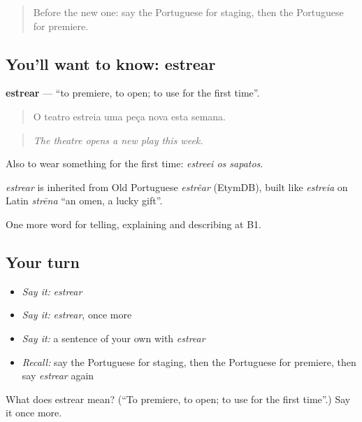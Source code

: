 \label{lesson:PT-C520-estrear}



\begin{quote}
Before the new one: say the Portuguese for staging, then the Portuguese for premiere.
\end{quote}

\subsection*{You'll want to know: estrear}
\textbf{estrear} — \textquotedblleft{}to premiere, to open; to use for the first time\textquotedblright{}.

\begin{quote}
O teatro estreia uma peça nova esta semana.
\end{quote}

\begin{quote}
\emph{The theatre opens a new play this week.}
\end{quote}

Also to wear something for the first time: \emph{estreei os sapatos}.

\begin{cousinweb}
\emph{estrear} is inherited from Old Portuguese \emph{estrẽar} (EtymDB), built like \emph{estreia} on Latin \emph{strēna} \textquotedblleft{}an omen, a lucky gift\textquotedblright{}.
\end{cousinweb}

\begin{grammarlens}[title={What you've built}]
One more word for telling, explaining and describing at B1.
\end{grammarlens}

\subsection*{Your turn}
\begin{itemize}
\raggedright
  \item \emph{Say it:} \emph{estrear}
  \item \emph{Say it:} \emph{estrear}, once more
  \item \emph{Say it:} a sentence of your own with \emph{estrear}
  \item \emph{Recall:} say the Portuguese for staging, then the Portuguese for premiere, then say \emph{estrear} again
\end{itemize}

\begin{tcolorbox}[breakable,colback=teal!4,colframe=teal!35!black,title={Before you move on}]
What does estrear mean? (\textquotedblleft{}To premiere, to open; to use for the first time\textquotedblright{}.) Say it once more.
\end{tcolorbox}
